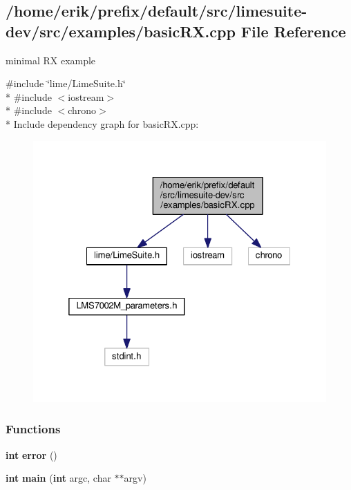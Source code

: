 \subsection{/home/erik/prefix/default/src/limesuite-\/dev/src/examples/basic\+RX.cpp File Reference}
\label{basicRX_8cpp}


minimal RX example  


{\ttfamily \#include \char`\"{}lime/\+Lime\+Suite.\+h\char`\"{}}\\*
{\ttfamily \#include $<$iostream$>$}\\*
{\ttfamily \#include $<$chrono$>$}\\*
Include dependency graph for basic\+R\+X.\+cpp\+:
\nopagebreak
\begin{figure}[H]
\begin{center}
\leavevmode
\includegraphics[width=325pt]{d7/d19/basicRX_8cpp__incl}
\end{center}
\end{figure}
\subsubsection*{Functions}
\begin{DoxyCompactItemize}
\item 
{\bf int} {\bf error} ()
\item 
{\bf int} {\bf main} ({\bf int} argc, char $\ast$$\ast$argv)
\end{DoxyCompactItemize}
